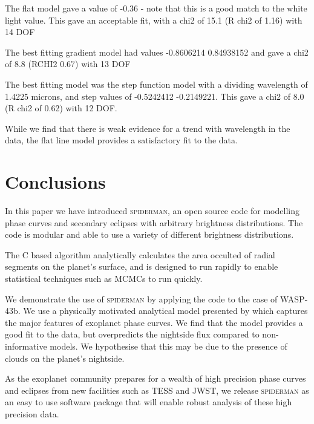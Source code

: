 \documentclass[a4paper,fleqn,usenatbib]{mnras}
\begin{document}
The flat model gave a value of -0.36 - note that this is a good match to the white light value. This gave an acceptable fit, with a chi2 of 15.1 (R chi2 of 1.16) with 14 DOF

The best fitting gradient model had values -0.8606214   0.84938152 and gave a chi2 of 8.8 (RCHI2 0.67) with 13 DOF

The best fitting model was the step function model with a dividing wavelength of 1.4225 microns, and step values of -0.5242412 -0.2149221. This gave a chi2 of 8.0 (R chi2 of 0.62) with 12 DOF.

While we find that there is weak evidence for a trend with wavelength in the data, the flat line model provides a satisfactory fit to the data.

\section{Conclusions}\label{sec:conclusions}

In this paper we have introduced \textsc{spiderman}, an open source code for modelling phase curves and secondary eclipses with arbitrary brightness distributions. The code is modular and able to use a variety of different brightness distributions.

The C based algorithm analytically calculates the area occulted of radial segments on the planet's surface, and is designed to run rapidly to enable statistical techniques such as MCMCs to run quickly.

We demonstrate the use of \textsc{spiderman} by applying the code to the case of WASP-43b. We use a physically motivated analytical model presented by \citet{Zhang2016} which captures the major features of exoplanet phase curves. We find that the model provides a good fit to the data, but overpredicts the nightside flux compared to non-informative models. We hypothesise that this may be due to the presence of clouds on the planet's nightside.

As the exoplanet community prepares for a wealth of high precision phase curves and eclipses from new facilities such as TESS and JWST, we release \textsc{spiderman} as an easy to use software package that will enable robust analysis of these high precision data.

\end{document}
